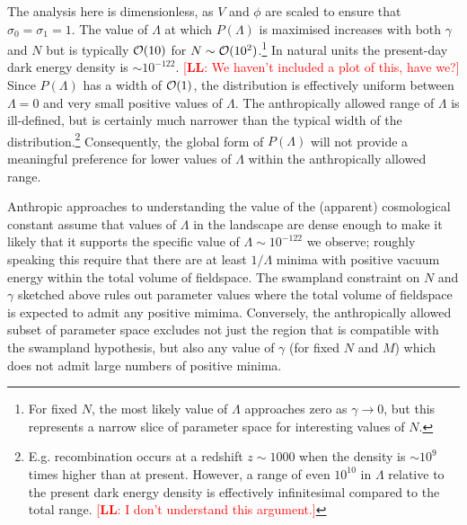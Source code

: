 \documentclass[12pt]{article}
\newcommand{\lfl}[1]{\textcolor{red}{[{\bf LL}: #1]}}
\begin{document}
The analysis  here is dimensionless, as $V$ and $\phi$ are scaled to ensure that $\sigma_0 = \sigma_1 = 1$. The value of $\Lambda$ at which $P(\Lambda)$ is maximised increases with both $\gamma$ and $N$ but  is typically  ${\cal{O}}(10)$ for $N\sim{\cal{O}}(10^2)$.\footnote{For fixed $N$, the most likely value of $\Lambda$ approaches zero as $\gamma \rightarrow 0$, but this represents a narrow slice of parameter space for interesting values of $N$.} In natural units the present-day dark energy density is $\sim 10^{-122}$. \lfl{We haven't included a plot of this, have we?} Since $P(\Lambda)$  has a width of  ${\cal{O}}(1)$, the distribution is effectively uniform between $\Lambda=0$ and very small positive values of $\Lambda$. The anthropically allowed range of $\Lambda$ is ill-defined, but is certainly much narrower than the typical width of the distribution.\footnote{E.g. recombination occurs at a redshift $z\sim 1000$ when the density is $\sim 10^9$ times higher than at present. However, a range of even $10^{10}$ in $\Lambda$ relative to the present dark energy density is effectively infinitesimal compared to the total range. \lfl{I don't understand this argument.}} Consequently, the global form of $P(\Lambda)$ will  not provide a meaningful preference for lower values of $\Lambda$ within the anthropically allowed range. 

Anthropic approaches to understanding the value of the (apparent) cosmological constant assume that values of $\Lambda$ in the landscape are  dense enough to make it likely that it supports the specific value of $\Lambda \sim 10^{-122}$ we observe; roughly speaking this require that there are at least $1/\Lambda$ minima with positive vacuum energy within the total volume of fieldspace. The swampland constraint on $N$ and $\gamma$ sketched above rules out parameter values where the total volume of fieldspace is expected to admit any positive mimima. Conversely, the anthropically allowed subset of parameter space excludes not just the region that is compatible with the swampland hypothesis, but also any value of $\gamma$ (for fixed $N$ and $M$) which does not admit large numbers of positive minima.
\end{document}
